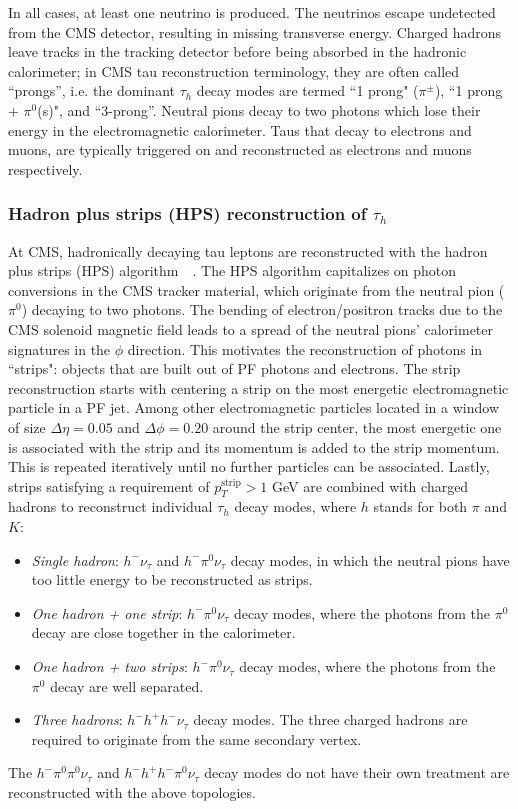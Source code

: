 In all cases, at least one neutrino is produced. The neutrinos escape undetected from the CMS detector, resulting in missing transverse energy. Charged hadrons leave tracks in the tracking detector before being absorbed in the hadronic calorimeter; in CMS tau reconstruction terminology, they are often called ``prongs'', i.e. the dominant $\tau_{h}$ decay modes are termed ``1 prong" ($\pi^\pm$), ``1 prong + $\pi^0$(s)", and ``3-prong''. Neutral pions decay to two photons which lose their energy in the electromagnetic calorimeter. Taus that decay to electrons and muons, are typically triggered on and reconstructed as electrons and muons respectively. 

\subsubsection{Hadron plus strips (HPS) reconstruction of \texorpdfstring{$\tau_{h}$}{tauh}}
At CMS, hadronically decaying tau leptons are reconstructed with the hadron plus strips (HPS) algorithm~\cite{CMS-TAU-14-001}~\cite{2012-JINST-7-P01001}. The HPS algorithm capitalizes on photon conversions in the CMS tracker material, which originate from the neutral pion ($\pi^0$) decaying to two photons. The bending of electron/positron tracks due to the CMS solenoid magnetic field leads to a spread of the neutral pions' calorimeter signatures in the $\phi$ direction. This motivates the reconstruction of photons in ``strips": objects that are built out of PF photons and electrons. The strip reconstruction starts with centering a strip on the most energetic electromagnetic particle in a PF jet. Among other electromagnetic particles located in a window of size $\Delta \eta = 0.05$ and $\Delta \phi = 0.20$ around the strip center, the most energetic one is associated with the strip and its momentum is added to the strip momentum. This is repeated iteratively until no further particles can be associated. Lastly, strips satisfying a requirement of $p_{T}^{\text{strip}} > 1$ GeV are combined with charged hadrons to reconstruct individual $\tau_{h}$ decay modes, where $h$ stands for both $\pi$ and $K$:
\begin{itemize}
    \item \textit{Single hadron}: $h^- \nu_{\tau}$ and $h^- \pi^0 \nu_{\tau}$ decay modes, in which the neutral pions have too little energy to be reconstructed as strips.
    \item \textit{One hadron + one strip}: $h^- \pi^0 \nu_{\tau}$ decay modes, where the photons from the $\pi^0$ decay are close together in the calorimeter.
    \item \textit{One hadron + two strips}: $h^- \pi^0 \nu_{\tau}$ decay modes, where the photons from the $\pi^0$ decay are well separated. 
    \item \textit{Three hadrons}: $h^- h^+ h^- \nu_{\tau}$ decay modes. The three charged hadrons are required to originate from the same secondary vertex.
\end{itemize}
The $h^- \pi^0 \pi^0 \nu_{\tau}$ and $h^- h^+ h^- \pi^0 \nu_{\tau}$ decay modes do not have their own treatment are reconstructed with the above topologies. 

